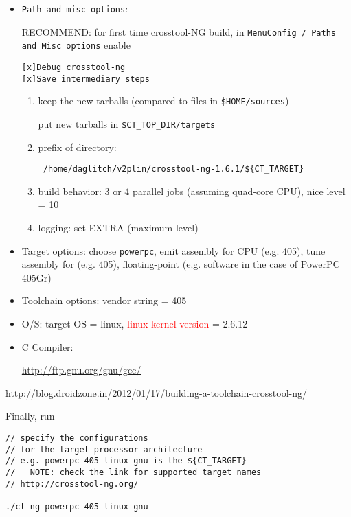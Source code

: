 \begin{itemize}
  \item \verb!Path and misc options!: 

RECOMMEND: for first time crosstool-NG build, in 
\verb!MenuConfig / Paths and Misc options! enable
\begin{verbatim}
[x]Debug crosstool-ng
[x]Save intermediary steps
\end{verbatim}
  
  \begin{enumerate}
    \item keep the new tarballs (compared to files in \verb!$HOME/sources!)
    
    put new tarballs in \verb!$CT_TOP_DIR/targets!
    
    \item prefix of directory: 
 \begin{verbatim}
 /home/daglitch/v2plin/crosstool-ng-1.6.1/${CT_TARGET}
 \end{verbatim}
 
   \item build behavior: 3 or 4 parallel jobs (assuming quad-core CPU), nice
   level = 10
   
   \item logging: set EXTRA (maximum level)
   
  \end{enumerate}

   \item Target options: choose \verb!powerpc!, emit assembly for CPU
   (e.g. 405), tune assembly for (e.g. 405), floating-point (e.g. software in
   the case of PowerPC 405Gr)
   
   \item Toolchain options: vendor string = 405
   
   \item O/S: target OS = linux, \textcolor{red}{linux kernel version} = 2.6.12
  
  \item C Compiler:
  
  \url{http://ftp.gnu.org/gnu/gcc/}
\end{itemize}
\url{http://blog.droidzone.in/2012/01/17/building-a-toolchain-crosstool-ng/}

Finally, run
\begin{verbatim}
// specify the configurations
// for the target processor architecture
// e.g. powerpc-405-linux-gnu is the ${CT_TARGET}
//   NOTE: check the link for supported target names
// http://crosstool-ng.org/

./ct-ng powerpc-405-linux-gnu
\end{verbatim}

